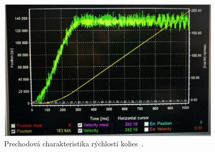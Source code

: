 \begin{figure}[!htbp]
	\begin{center}
		\includegraphics[width=0.95\textwidth]{img/robotSpeedChar.png}
	\end{center}
	\caption{Prechodová charakteristika rýchlosti kolies~\cite{timovyProjekt}. }
	\label{fig:prechChar}
\end{figure}

